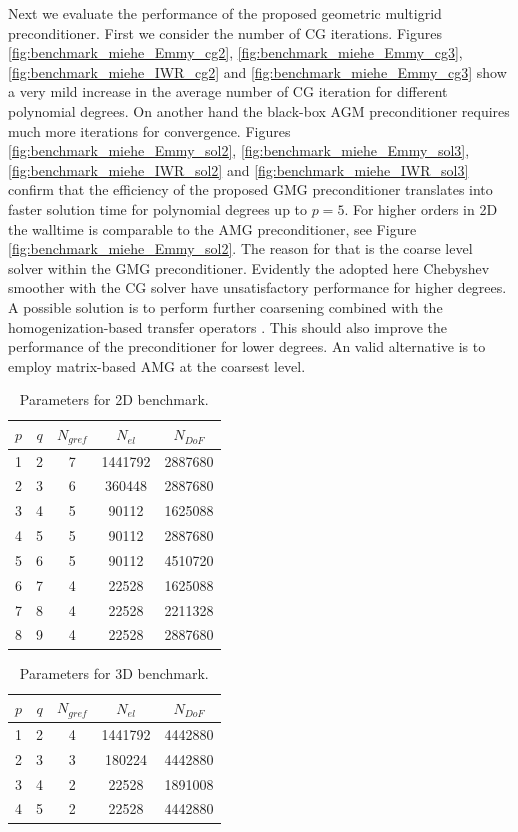 \documentclass[preprint,12pt,times]{elsarticle}
\begin{document}
Next we evaluate the performance of the proposed geometric multigrid preconditioner. First we consider the number of CG iterations.
Figures \ref{fig:benchmark_miehe_Emmy_cg2}, \ref{fig:benchmark_miehe_Emmy_cg3}, \ref{fig:benchmark_miehe_IWR_cg2} and \ref{fig:benchmark_miehe_Emmy_cg3} show a very mild increase in the average number of CG iteration for different polynomial degrees. On another hand the black-box AGM preconditioner requires much more iterations for convergence.
Figures \ref{fig:benchmark_miehe_Emmy_sol2}, \ref{fig:benchmark_miehe_Emmy_sol3}, \ref{fig:benchmark_miehe_IWR_sol2} and \ref{fig:benchmark_miehe_IWR_sol3} confirm that the efficiency of the proposed GMG preconditioner translates into faster solution time for polynomial degrees up to $p=5$. For higher orders in 2D the walltime is comparable to the AMG preconditioner, see Figure \ref{fig:benchmark_miehe_Emmy_sol2}.
The reason for that is the coarse level solver within the GMG preconditioner. Evidently the adopted here Chebyshev smoother with the CG solver have unsatisfactory performance for higher degrees.
A possible solution is to perform further coarsening combined with the homogenization-based transfer operators \cite{Miehe2007}. This should also improve the performance of the preconditioner for lower degrees.
An valid alternative is to employ matrix-based AMG at the coarsest level.

\begin{table}
  \centering
  \begin{tabular}{ccccc}
  \hline
    $p$ & $q$ & $N_{gref}$ & $N_{el}$ & $N_{DoF}$ \\
  \hline
    1 & 2 & 7 & 1441792 & 2887680 \\
    2 & 3 & 6 & 360448 & 2887680 \\
    3 & 4 & 5 & 90112 & 1625088 \\
    4 & 5 & 5 & 90112 & 2887680 \\
    5 & 6 & 5 & 90112 & 4510720 \\
    6 & 7 & 4 & 22528 & 1625088 \\
    7 & 8 & 4 & 22528 & 2211328 \\
    8 & 9 & 4 & 22528 & 2887680 \\
  \hline
  \end{tabular}
  \caption{Parameters for 2D benchmark.
  }
  \label{tab:input_parameters_2d}
\end{table}

\begin{table}
  \centering
  \begin{tabular}{ccccc}
  \hline
    $p$ & $q$ & $N_{gref}$ & $N_{el}$ & $N_{DoF}$ \\
  \hline
    1 & 2 & 4 & 1441792 & 4442880 \\
    2 & 3 & 3 & 180224 & 4442880 \\
    3 & 4 & 2 & 22528 & 1891008 \\
    4 & 5 & 2 & 22528 & 4442880 \\
  \hline
  \end{tabular}
  \caption{Parameters for 3D benchmark.
  }
  \label{tab:input_parameters_3d}
\end{table}
\end{document}
